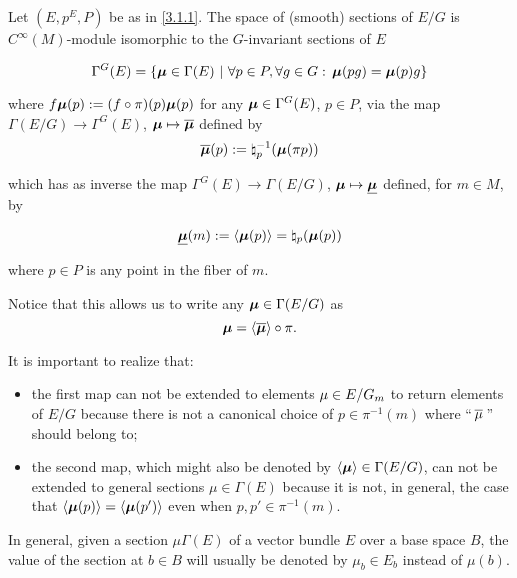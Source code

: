\begin{proposition}
Let $(E, p^E, P)$ be as in \ref{3.1.1}. The space of (smooth) sections of $E/G$ is $C^\infty(M)$-module isomorphic to the $G$-invariant sections of $E$ 

\[ 
    \Gamma^G(E) = \left\{ \bm{\mu} \in \Gamma(E) \ |\  \forall p \in P, \forall g \in G:\, \bm{\mu}(pg) = \bm{\mu}(p)g \right\}
\] 

where $f \bm{\mu} (p) := (f \circ \pi)(p) \bm{\mu}(p)$ for any $\bm{\mu} \in \Gamma^G(E)$, $p \in P$, via the map $\Gamma(E/G) \to \Gamma^G(E)$, $\bm{\mathfrak{\mu}} \mapsto \overline{\bm{\mathfrak{\mu}}}$ defined by 
\[
    \overline{\bm{\mathfrak{\mu}}}(p) := \natural_p^{-1}(\bm{\mathfrak{\mu}}(\pi p))
\] %

which has as inverse the map $\Gamma^G(E) \to \Gamma(E/G)$, $\bm{\mu} \mapsto \underline{\bm{\mu}}$ defined, for $m \in M$, by

\[
    \underline{\bm{\mu}}(m) := \langle \bm{\mu}(p) \rangle = \natural_p(\bm{\mu}(p))
\]

where $p \in P$ is any point in the fiber of $m$.
\end{proposition}

Notice that this allows us to write any $\bm{\mathfrak{\mu}} \in \Gamma(E/G)$ as \[\bm{\mathfrak{\mu}} = \langle \overline{\bm{\mathfrak{\mu}}} \rangle \circ \pi.\] 

It is important to realize that:

\begin{itemize}
    \item the first map can not be extended to elements $\mathfrak{\mu} \in E/G_m$ to return elements of $E/G$ because there is not a canonical choice of $p \in \pi^{-1}(m)$ where ``$\,\overline{\mathfrak{\mu}}\,$'' should belong to;
    
    \item the second map, which might also be denoted by $\langle \bm{\mu} \rangle \in \Gamma(E/G)$, can not be extended to general sections $\mu \in \Gamma(E)$ because it is not, in general, the case that $\langle \bm{\mu}(p) \rangle = \langle \bm{\mu}(p') \rangle$ even when $p, p' \in \pi^{-1}(m)$.
\end{itemize}

In general, given a section $\mu \Gamma(E)$ of a vector bundle $E$ over a base space $B$, the value of the section at $b\in B$ will usually be denoted by $\mu_b \in E_b$ instead of $\mu(b)$.

